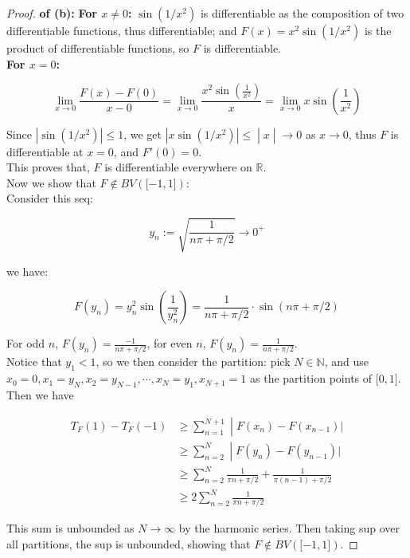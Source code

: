 \begin{proof}

\textbf{of (b):} \textbf{For \(x \neq 0\):} \(\sin(1/x^{2})\) is differentiable as the composition of two differentiable functions, thus differentiable; and \(F(x) = x^{2}\sin\left( {1/x^{2}} \right)\) is the product of differentiable functions, so \(F\) is differentiable.\\
\textbf{For \(x = 0\):}

\[\lim\limits_{x\rightarrow 0}\frac{F(x) - F(0)}{x - 0} = \lim\limits_{x\rightarrow 0}\frac{x^{2}\sin\left( \frac{1}{x^{2}} \right)}{x} = \lim\limits_{x\rightarrow 0}x\sin\left( \frac{1}{x^{2}} \right)\]

Since \(\left| {\sin\left( {1/x^{2}} \right)} \right| \leq 1\), we get \(\left. \left| {x\sin\left( {1/x^{2}} \right)} \right| \leq \middle| x \middle| \rightarrow 0 \right.\) as \(x\rightarrow 0\), thus \(F\) is differentiable at \(x = 0\), and \(F'(0) = 0\).\\
This proves that, \(F\) is differentiable everywhere on \(\mathbb{R}\).\\
Now we show that \(F \notin BV(\lbrack - 1,1\rbrack)\):\\
Consider this seq:

\[y_{n} := \sqrt{\frac{1}{n\pi + \pi/2}}\rightarrow 0^{+}\]

we have:

\[F\left( y_{n} \right) = y_{n}^{2}\sin\left( \frac{1}{y_{n}^{2}} \right) = \frac{1}{n\pi + \pi/2} \cdot \sin(n\pi + \pi/2)\]

For odd \(n\), \(F(y_{n}) = \frac{- 1}{n\pi + \pi/2}\), for even \(n\), \(F(y_{n}) = \frac{1}{n\pi + \pi/2}\).\\
Notice that \(y_{1} < 1\), so we then consider the partition: pick \(N \in \mathbb{N}\), and use \(x_{0} = 0,x_{1} = y_{N},x_{2} = y_{N - 1},\cdots,x_{N} = y_{1},x_{N + 1} = 1\) as the partition points of \(\lbrack 0,1\rbrack\).\\
Then we have

\[\begin{matrix}
{T_{F}(1) - T_{F}( - 1)} & \left. \geq \sum\limits_{n = 1}^{N + 1} \middle| F(x_{n}) - F(x_{n - 1})| \right. \\
 & \left. \geq \sum\limits_{n = 2}^{N} \middle| F(y_{n}) - F(y_{n - 1})| \right. \\
 & {\geq \sum\limits_{n = 2}^{N}\frac{1}{\pi n + \pi/2} + \frac{1}{\pi(n - 1) + \pi/2}} \\
 & {\geq 2\sum\limits_{n = 2}^{N}\frac{1}{\pi n + \pi/2}}
\end{matrix}\]

This sum is unbounded as \(N\rightarrow\infty\) by the harmonic series. Then taking sup over all partitions, the sup is unbounded, showing that \(F \notin BV(\lbrack - 1,1\rbrack)\).

\end{proof}

